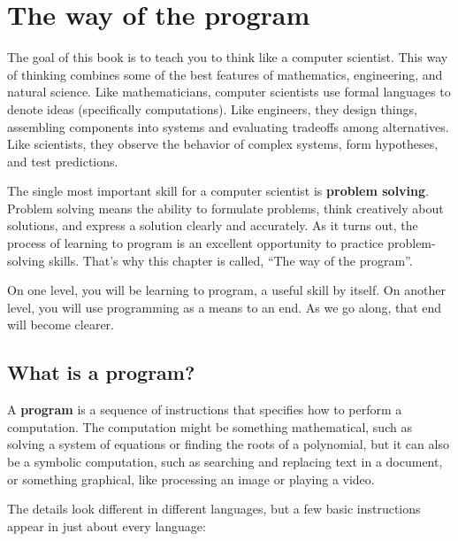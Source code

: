 \chapter{The way of the program}

The goal of this book is to teach you to think like a computer
scientist.  This way of thinking combines some of the best features of
mathematics, engineering, and natural science.  Like mathematicians,
computer scientists use formal languages to denote ideas (specifically
computations).  Like engineers, they design things, assembling
components into systems and evaluating tradeoffs among alternatives.
Like scientists, they observe the behavior of complex systems, form
hypotheses, and test predictions.  

The single most important skill for a computer scientist is {\bf
problem solving}.  Problem solving means the ability to formulate
problems, think creatively about solutions, and express a solution
clearly and accurately.  As it turns out, the process of learning to
program is an excellent opportunity to practice problem-solving
skills.  That's why this chapter is called, ``The way of the
program''.

On one level, you will be learning to program, a useful skill by
itself.  On another level, you will use programming as a means to an
end.  As we go along, that end will become clearer.


\section{What is a program?}

A {\bf program} is a sequence of instructions that specifies how to
perform a computation.  The computation might be something
mathematical, such as solving a system of equations or finding the
roots of a polynomial, but it can also be a symbolic computation, such
as searching and replacing text in a document, or something
graphical, like processing an image or playing a video.

The details look different in different languages, but a few basic
instructions appear in just about every language:

